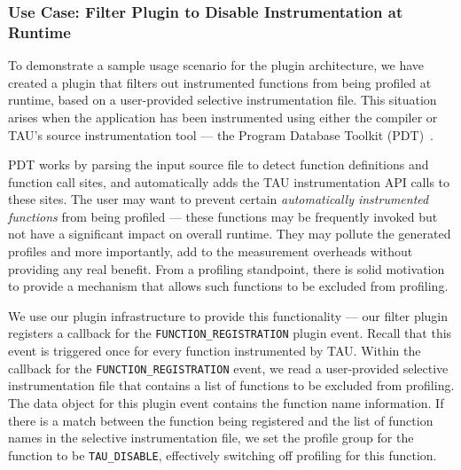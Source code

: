 \subsubsection{Use Case: Filter Plugin to Disable Instrumentation at Runtime}
To demonstrate a sample usage scenario for the plugin architecture, we have created a plugin that filters out instrumented functions from being profiled at runtime, based on a user-provided selective instrumentation file. This situation arises when the application has been instrumented using either the compiler or TAU's source instrumentation tool --- the Program Database Toolkit (PDT)~\cite{PDT}.
\par PDT works by parsing the input source file to detect function definitions and function call sites, and automatically adds the TAU instrumentation API calls to these sites. The user may want to prevent certain \textit{automatically instrumented functions} from being profiled --- these functions may be frequently invoked but not have a significant impact on overall runtime. They may pollute the generated profiles and more importantly, add to the measurement overheads without providing any real benefit. From a profiling standpoint, there is solid motivation to provide a mechanism that allows such functions to be excluded from profiling.
\par We use our plugin infrastructure to provide this functionality --- our filter plugin registers a callback for the \verb+FUNCTION_REGISTRATION+ plugin event. Recall that this event is triggered once for every function instrumented by TAU. Within the callback for the \verb+FUNCTION_REGISTRATION+ event, we read a user-provided selective instrumentation file that contains a list of functions to be excluded from profiling. The data object for this plugin event contains the function name information. If there is a match between the function being registered and the list of function names in the selective instrumentation file, we set the profile group for the function to be \verb+TAU_DISABLE+, effectively switching off profiling for this function.

